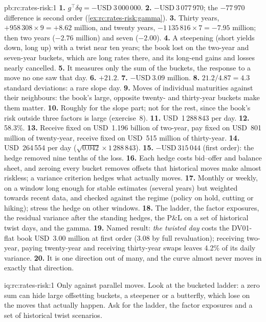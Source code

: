 \begin{solution}{pb:rc:rates-risk:1}
\textbf{1.} $g^\top\delta q = -\text{USD}~3\,000\,000$.
\textbf{2.} $-\text{USD}~3\,077\,970$; the $-77\,970$ difference is second order
(\cref{ex:rc:rates-risk:gamma}).
\textbf{3.} Thirty years, $+958\,308\times9 = +8.62$ million, and twenty years,
$-1\,135\,816\times7 = -7.95$ million; then two years ($-2.76$ million) and seven
($-2.00$).
\textbf{4.} A steepening (short yields down, long up) with a twist near ten years;
the book lost on the two-year and seven-year buckets, which are long rates
there, and its long-end gains and losses nearly cancelled.
\textbf{5.} It measures only the sum of the buckets, the response to a move no one
saw that day.
\textbf{6.} $+21.2$.
\textbf{7.} $-\text{USD}~3.09$ million.
\textbf{8.} $21.2/4.87 = 4.3$ standard deviations: a rare slope day.
\textbf{9.} Moves of individual maturities against their neighbours: the book's
large, opposite twenty- and thirty-year buckets make them matter.
\textbf{10.} Roughly for the slope part; not for the rest, since the book's risk
outside three factors is large (exercise~8).
\textbf{11.} USD~1\,288\,843 per day.
\textbf{12.} 58.3\%.
\textbf{13.} Receive fixed on USD~1.196 billion of two-year, pay fixed on USD~801
million of twenty-year, receive fixed on USD~515 million of thirty-year.
\textbf{14.} USD~264\,554 per day ($\sqrt{0.042}\times1\,288\,843$).
\textbf{15.} $-\text{USD}~315\,044$ (first order): the hedge removed nine tenths of
the loss.
\textbf{16.} Each hedge costs bid--offer and balance sheet, and zeroing every bucket
removes offsets that historical moves make almost riskless; a variance
criterion hedges what actually moves.
\textbf{17.} Monthly or weekly, on a window long enough for stable estimates
(several years) but weighted towards recent data, and checked against the
regime (policy on hold, cutting or hiking); stress the hedge on other windows.
\textbf{18.} The ladder, the factor exposures, the residual variance after the
standing hedges, the P\&L on a set of historical twist days, and the gamma.
\textbf{19.} Named result: \emph{the twisted day} costs the DV01-flat book USD~3.00
million at first order (3.08 by full revaluation); receiving two-year, paying
twenty-year and receiving thirty-year swaps leaves 4.2\% of its daily variance.
\textbf{20.} It is one direction out of many, and the curve almost never moves in
exactly that direction.
\end{solution}

\begin{solution}{iq:rc:rates-risk:1}
Only against parallel moves. Look at the bucketed ladder: a zero sum can hide
large offsetting buckets, a steepener or a butterfly, which lose on the moves
that actually happen. Ask for the ladder, the factor exposures and a set of
historical twist scenarios.
\end{solution}

